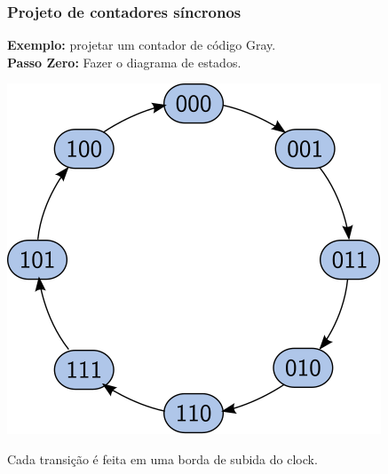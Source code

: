 \documentclass{beamer}
\begin{document}
\begin{frame}
\frametitle{Projeto de contadores síncronos}

\textbf{Exemplo:} projetar um contador de código Gray.\\[12pt]

\textbf{Passo Zero:} Fazer o diagrama de estados.
\begin{center}
\includegraphics[scale=0.9]{images/gray_counter_states}
\end{center}
Cada transição é feita em uma borda de subida do clock.

\end{frame}
\end{document}
